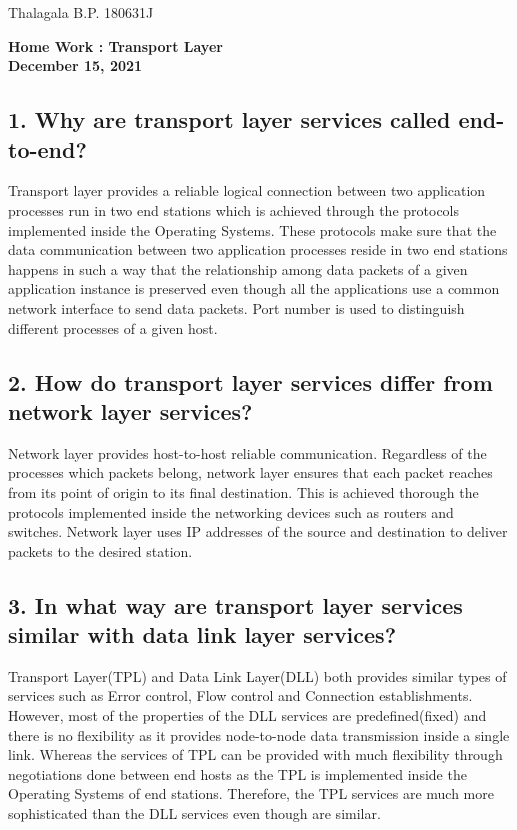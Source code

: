\documentclass[a4paper,11pt]{article}
\begin{document}
	Thalagala B.P. 180631J
\begin{center}
{	\Large\textbf{Home Work : Transport Layer}}\\[2mm]

\textbf{December 15, 2021}
\end{center}



\subsection*{1. Why are transport layer services called end-to-end?}

Transport layer provides a reliable logical connection between two application processes run in two end stations which is achieved through the  protocols implemented inside the Operating Systems. These protocols make sure that the data communication between two application processes reside in two end stations happens in such a way that the relationship among data packets of a given application instance is preserved even though all the applications use a common network interface to send data packets. Port number is used to distinguish different processes of a given host.

\subsection*{2. How do transport layer services differ from network layer services?}

Network layer provides host-to-host reliable communication. Regardless of the processes which packets belong, network layer ensures that each packet reaches from its point of origin to its final destination. This is achieved thorough the protocols implemented inside the networking devices such as routers and switches. Network layer uses IP addresses of the source and destination to deliver packets to the desired station.

\subsection*{3. In what way are transport layer services similar with data link layer services?}

Transport Layer(TPL) and Data Link Layer(DLL) both provides similar types of services such as Error control, Flow control and Connection establishments. However, most of the properties of the DLL services are predefined(fixed) and there is no flexibility as it provides node-to-node data transmission inside a single link. Whereas the services of TPL can be  provided with much flexibility through negotiations done between end hosts as the TPL is implemented inside the Operating Systems of end stations. Therefore, the TPL services are much more sophisticated than the DLL services even though are similar.
\end{document}
